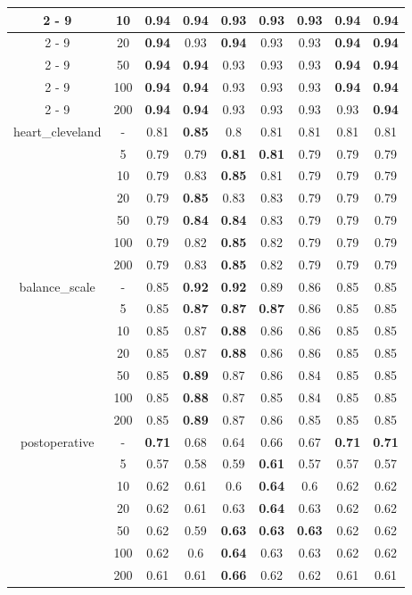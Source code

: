 \documentclass{article}%
\begin{document}
\begin{longtable}{c|c|ccccccc}
\cline{2%
-%
9}%
&10&\textbf{0.94}&\textbf{0.94}&0.93&0.93&0.93&\textbf{0.94}&\textbf{0.94}\\%
\cline{2%
-%
9}%
&20&\textbf{0.94}&0.93&\textbf{0.94}&0.93&0.93&\textbf{0.94}&\textbf{0.94}\\%
\cline{2%
-%
9}%
&50&\textbf{0.94}&\textbf{0.94}&0.93&0.93&0.93&\textbf{0.94}&\textbf{0.94}\\%
\cline{2%
-%
9}%
&100&\textbf{0.94}&\textbf{0.94}&0.93&0.93&0.93&\textbf{0.94}&\textbf{0.94}\\%
\cline{2%
-%
9}%
&200&\textbf{0.94}&\textbf{0.94}&0.93&0.93&0.93&0.93&\textbf{0.94}\\%
\hline%
\multirow{7}{*}{heart\_cleveland}&{-}&0.81&\textbf{0.85}&0.8&0.81&0.81&0.81&0.81\\%
\cline{2%
-%
9}%
&5&0.79&0.79&\textbf{0.81}&\textbf{0.81}&0.79&0.79&0.79\\%
\cline{2%
-%
9}%
&10&0.79&0.83&\textbf{0.85}&0.81&0.79&0.79&0.79\\%
\cline{2%
-%
9}%
&20&0.79&\textbf{0.85}&0.83&0.83&0.79&0.79&0.79\\%
\cline{2%
-%
9}%
&50&0.79&\textbf{0.84}&\textbf{0.84}&0.83&0.79&0.79&0.79\\%
\cline{2%
-%
9}%
&100&0.79&0.82&\textbf{0.85}&0.82&0.79&0.79&0.79\\%
\cline{2%
-%
9}%
&200&0.79&0.83&\textbf{0.85}&0.82&0.79&0.79&0.79\\%
\hline%
\multirow{7}{*}{balance\_scale}&{-}&0.85&\textbf{0.92}&\textbf{0.92}&0.89&0.86&0.85&0.85\\%
\cline{2%
-%
9}%
&5&0.85&\textbf{0.87}&\textbf{0.87}&\textbf{0.87}&0.86&0.85&0.85\\%
\cline{2%
-%
9}%
&10&0.85&0.87&\textbf{0.88}&0.86&0.86&0.85&0.85\\%
\cline{2%
-%
9}%
&20&0.85&0.87&\textbf{0.88}&0.86&0.86&0.85&0.85\\%
\cline{2%
-%
9}%
&50&0.85&\textbf{0.89}&0.87&0.86&0.84&0.85&0.85\\%
\cline{2%
-%
9}%
&100&0.85&\textbf{0.88}&0.87&0.85&0.84&0.85&0.85\\%
\cline{2%
-%
9}%
&200&0.85&\textbf{0.89}&0.87&0.86&0.85&0.85&0.85\\%
\hline%
\multirow{7}{*}{postoperative}&{-}&\textbf{0.71}&0.68&0.64&0.66&0.67&\textbf{0.71}&\textbf{0.71}\\%
\cline{2%
-%
9}%
&5&0.57&0.58&0.59&\textbf{0.61}&0.57&0.57&0.57\\%
\cline{2%
-%
9}%
&10&0.62&0.61&0.6&\textbf{0.64}&0.6&0.62&0.62\\%
\cline{2%
-%
9}%
&20&0.62&0.61&0.63&\textbf{0.64}&0.63&0.62&0.62\\%
\cline{2%
-%
9}%
&50&0.62&0.59&\textbf{0.63}&\textbf{0.63}&\textbf{0.63}&0.62&0.62\\%
\cline{2%
-%
9}%
&100&0.62&0.6&\textbf{0.64}&0.63&0.63&0.62&0.62\\%
\cline{2%
-%
9}%
&200&0.61&0.61&\textbf{0.66}&0.62&0.62&0.61&0.61\\%
\hline%
\end{longtable}
\end{document}
